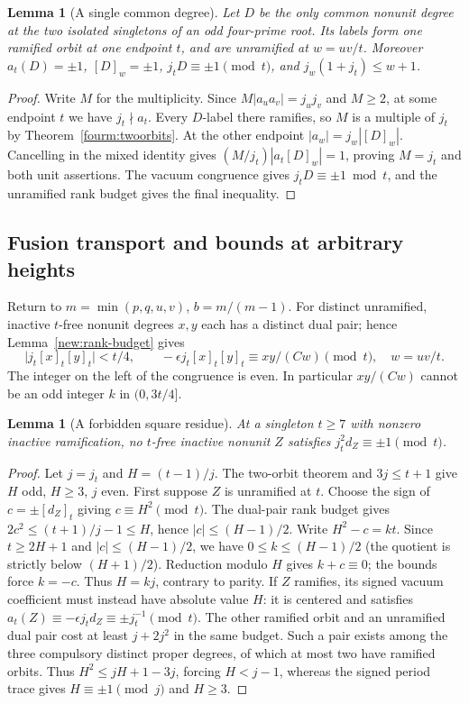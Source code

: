 \documentclass[11pt,a4paper]{article}
\numberwithin{equation}{section}
\newtheorem{lemma}[theorem]{Lemma}
\theoremstyle{remark}
\begin{document}
\begin{lemma}[A single common degree]\label{fam:M:9.8}\label{fourm:sole}
Let $D$ be the only common nonunit degree at the two isolated
singletons of an odd four-prime root. Its labels form one ramified
orbit at one endpoint $t$, and are unramified at $w=uv/t$.
Moreover $a_t(D)=\pm1$, $[D]_w=\pm1$, $j_tD\equiv\pm1\pmod t$,
and $j_w(1+j_t)\le w+1$.
\end{lemma}
\begin{proof}
Write $M$ for the multiplicity. Since
$M|a_u a_v|=j_u j_v$ and $M\ge2$, at some endpoint $t$ we have
$j_t\nmid a_t$. Every $D$-label there ramifies, so $M$ is a
multiple of $j_t$ by Theorem~\ref{fourm:twoorbits}. At the other
endpoint $|a_w|=j_w|[D]_w|$. Cancelling in the mixed identity gives
$(M/j_t)|a_t[D]_w|=1$, proving $M=j_t$ and both unit assertions.
The vacuum congruence gives $j_tD\equiv\pm1\bmod t$, and the
unramified rank budget gives the final inequality.

\end{proof}

\subsection{Fusion transport and bounds at arbitrary heights}\label{fam:M:sec:9.2}
Return to $m=\min(p,q,u,v)$, $b=m/(m-1)$. For distinct unramified, inactive $t$-free nonunit degrees $x,y$ each
has a distinct dual pair; hence Lemma~\ref{new:rank-budget} gives
\begin{equation}
  \big|j_t[x]_t[y]_t\big|<t/4,\qquad
  -\epsilon j_t[x]_t[y]_t\equiv xy/(Cw)\pmod t,\quad w=uv/t .
  \label{eq:four-product}
\end{equation}
The integer on the left of the congruence is even. In particular
$xy/(Cw)$ cannot be an odd integer $k$ in $(0,3t/4]$.

\begin{lemma}[A forbidden square residue]\label{fam:M:9.9}\label{new:forbidden-square}
At a singleton $t\ge7$ with nonzero inactive ramification, no $t$-free inactive nonunit $Z$ satisfies $j_t^2 d_Z\equiv\pm1\pmod t$.
\end{lemma}
\begin{proof}
Let $j=j_t$ and $H=(t-1)/j$. The two-orbit theorem and $3j\le t+1$ give $H$ odd, $H\ge3$, $j$ even. First suppose $Z$ is unramified at $t$. Choose the sign of $c=\pm[d_Z]_t$ giving $c\equiv H^2\pmod t$. The dual-pair rank budget gives $2c^2\le(t+1)/j-1\le H$, hence $|c|\le(H-1)/2$. Write $H^2-c=kt$.
Since $t\ge2H+1$ and $|c|\le(H-1)/2$, we have $0\le k\le(H-1)/2$ (the quotient is strictly below $(H+1)/2$). Reduction modulo $H$ gives $k+c\equiv0$; the bounds force $k=-c$. Thus $H=kj$, contrary to parity.
If $Z$ ramifies, its signed vacuum coefficient must instead have
absolute value $H$: it is centered and satisfies $a_t(Z)\equiv
-\epsilon j_td_Z\equiv\pm j_t^{-1}\pmod t$. The other ramified orbit
and an unramified dual pair cost at least $j+2j^2$ in the same
budget. Such a pair exists among the three compulsory distinct
proper degrees, of which at most two have ramified orbits. Thus
$H^2\le jH+1-3j$, forcing $H<j-1$, whereas the signed period
trace gives $H\equiv\pm1\pmod j$ and $H\ge3$.
\end{proof}
\end{document}
